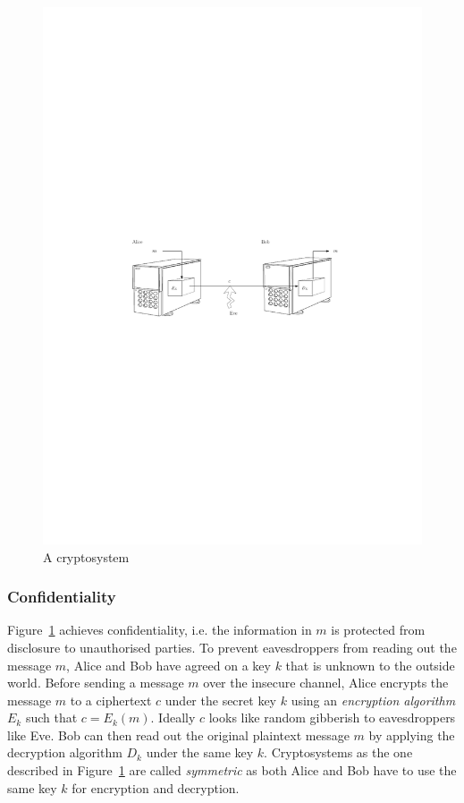 \begin{figure}[H]
 \includegraphics[trim=40mm 120mm 40mm 120mm, clip]{img/cryptosystem.pdf}
 \caption{A cryptosystem~\cite{thesis:Wyseur09}}
 \label{fig:cryptosystem}
\end{figure}

\subsubsection{Confidentiality}
Figure~\ref{fig:cryptosystem} achieves confidentiality, i.e. the information in $m$ is protected from disclosure to unauthorised parties. To prevent eavesdroppers from reading out the message $m$, Alice and Bob have agreed on a key $k$ that is unknown to the outside world. Before sending a message $m$ over the insecure channel, Alice encrypts the message $m$ to a ciphertext $c$ under the secret key $k$ using an \textit{encryption algorithm} $E_k$ such that $c = E_k \left( m \right)$. Ideally $c$ looks like random gibberish to eavesdroppers like Eve. Bob can then read out the original plaintext message $m$ by applying the decryption algorithm $D_k$ under the same key $k$. Cryptosystems as the one described in Figure~\ref{fig:cryptosystem} are called \textit{symmetric} as both Alice and Bob have to use the same key $k$ for encryption and decryption. 

